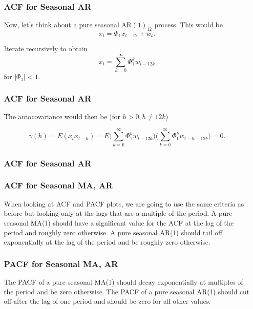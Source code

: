 \documentclass[%
xcolor=pdftex]{beamer}
\begin{document}
\begin{frame}
\frametitle{ACF for Seasonal AR}

Now, let's think about a pure seasonal AR$(1)_{12}$ process.  This would be
$$
x_t= \Phi_1 x_{t-12}+w_t.
$$

Iterate recursively to obtain
$$
x_t= \sum_{k=0}^\infty \Phi_1^k w_{t-12k}
$$
for $|\Phi_1|<1$.
\end{frame}

\begin{frame}
\frametitle{ACF for Seasonal AR}

The autocovariance would then be (for $h>0, h\neq12k$)

$$
\gamma(h)=E(x_t x_{t-h})=E \Big ( \sum_{k=0}^\infty \Phi_1^k w_{t-12k} \Big )\Big ( \sum_{k=0}^\infty \Phi_1^k w_{t-h-12k} \Big )=0.
$$

\end{frame}

\begin{frame}
\frametitle{ACF for Seasonal AR}



\end{frame}

\begin{frame}
\frametitle{ACF for Seasonal MA, AR}

When looking at ACF and PACF plots, we are going
to use the same criteria as before but looking only at the
lags that are a multiple of the period.  A pure seasonal MA(1)
should have a significant value for the ACF at the
lag of the period and roughly zero otherwise.  A pure seasonal
AR(1) should tail off exponentially at the lag of the period and
 be roughly zero otherwise.

\end{frame}

\begin{frame}
\frametitle{PACF for Seasonal MA, AR}

The PACF of a pure seasonal MA(1) should decay exponentially
 at multiples of the period and be zero otherwise.
 The PACF of a pure seasonal AR(1) should cut off after the
 lag of one period and should be zero for all other values.

\end{frame}
\end{document}
